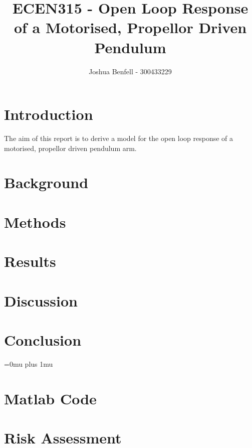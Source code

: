 \documentclass[a4paper, 12pt, compsoc]{IEEEtran}
\title{ECEN315 - Open Loop Response of a Motorised, Propellor Driven Pendulum}
\author{Joshua Benfell - 300433229}
\begin{document}
    \maketitle
    \IEEEdisplaynontitleabstractindextext

    \section{Introduction}\label{sec:intro}
        The aim of this report is to derive a model for the open loop response of a motorised, propellor driven pendulum arm. 

    \section{Background}\label{sec:bg}
    \section{Methods}\label{sec:methods}
    \section{Results}\label{sec:results}
    \section{Discussion}\label{sec:discussion}
    \section{Conclusion}\label{sec:conclusion}


    \Urlmuskip=0mu plus 1mu\relax
    
    
    \pagebreak
    \begin{appendices}
        \section{Matlab Code}
            
            
        \section{Risk Assessment}
    \end{appendices}
\end{document}
